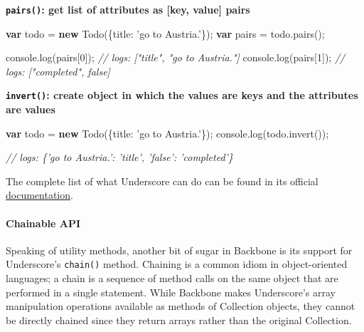 \documentclass[9pt]{book}
\newenvironment{Shaded}{}{}
\newcommand{\KeywordTok}[1]{\textcolor[rgb]{0.00,0.44,0.13}{\textbf{{#1}}}}
\newcommand{\DataTypeTok}[1]{\textcolor[rgb]{0.56,0.13,0.00}{{#1}}}
\newcommand{\DecValTok}[1]{\textcolor[rgb]{0.25,0.63,0.44}{{#1}}}
\newcommand{\StringTok}[1]{\textcolor[rgb]{0.25,0.44,0.63}{{#1}}}
\newcommand{\CommentTok}[1]{\textcolor[rgb]{0.38,0.63,0.69}{\textit{{#1}}}}
\newcommand{\OtherTok}[1]{\textcolor[rgb]{0.00,0.44,0.13}{{#1}}}
\newcommand{\FunctionTok}[1]{\textcolor[rgb]{0.02,0.16,0.49}{{#1}}}
\newcommand{\NormalTok}[1]{{#1}}
\begin{document}
\textbf{\texttt{pairs()}: get list of attributes as {[}key, value{]}
pairs}

\begin{Shaded}
\begin{Highlighting}[]
\KeywordTok{var} \NormalTok{todo = }\KeywordTok{new} \FunctionTok{Todo}\NormalTok{(\{}\DataTypeTok{title}\NormalTok{: }\StringTok{'go to Austria.'}\NormalTok{\});}
\KeywordTok{var} \NormalTok{pairs = }\OtherTok{todo}\NormalTok{.}\FunctionTok{pairs}\NormalTok{();}

\OtherTok{console}\NormalTok{.}\FunctionTok{log}\NormalTok{(pairs[}\DecValTok{0}\NormalTok{]);}
\CommentTok{// logs: ["title", "go to Austria."]}
\OtherTok{console}\NormalTok{.}\FunctionTok{log}\NormalTok{(pairs[}\DecValTok{1}\NormalTok{]);}
\CommentTok{// logs: ["completed", false]}
\end{Highlighting}
\end{Shaded}

\textbf{\texttt{invert()}: create object in which the values are keys
and the attributes are values}

\begin{Shaded}
\begin{Highlighting}[]
\KeywordTok{var} \NormalTok{todo = }\KeywordTok{new} \FunctionTok{Todo}\NormalTok{(\{}\DataTypeTok{title}\NormalTok{: }\StringTok{'go to Austria.'}\NormalTok{\});}
\OtherTok{console}\NormalTok{.}\FunctionTok{log}\NormalTok{(}\OtherTok{todo}\NormalTok{.}\FunctionTok{invert}\NormalTok{());}

\CommentTok{// logs: \{'go to Austria.': 'title', 'false': 'completed'\}}
\end{Highlighting}
\end{Shaded}

The complete list of what Underscore can do can be found in its official
\href{http://documentcloud.github.com/underscore/}{documentation}.

\paragraph{Chainable API}\label{chainable-api}

Speaking of utility methods, another bit of sugar in Backbone is its
support for Underscore's \texttt{chain()} method. Chaining is a common
idiom in object-oriented languages; a chain is a sequence of method
calls on the same object that are performed in a single statement. While
Backbone makes Underscore's array manipulation operations available as
methods of Collection objects, they cannot be directly chained since
they return arrays rather than the original Collection.
\end{document}
